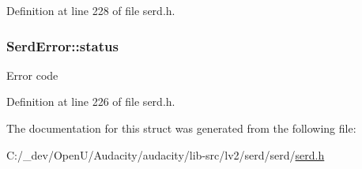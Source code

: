 Definition at line 228 of file serd.\+h.

\subsubsection[{\texorpdfstring{status}{status}}]{ Serd\+Error\+::status}\hypertarget{struct_serd_error_ad24bd4cffdaeacbe833b20ded1e81e4c}{}\label{struct_serd_error_ad24bd4cffdaeacbe833b20ded1e81e4c}
Error code 

Definition at line 226 of file serd.\+h.



The documentation for this struct was generated from the following file\+:\begin{DoxyCompactItemize}
\item 
C\+:/\+\_\+dev/\+Open\+U/\+Audacity/audacity/lib-\/src/lv2/serd/serd/\hyperlink{serd_8h}{serd.\+h}\end{DoxyCompactItemize}

